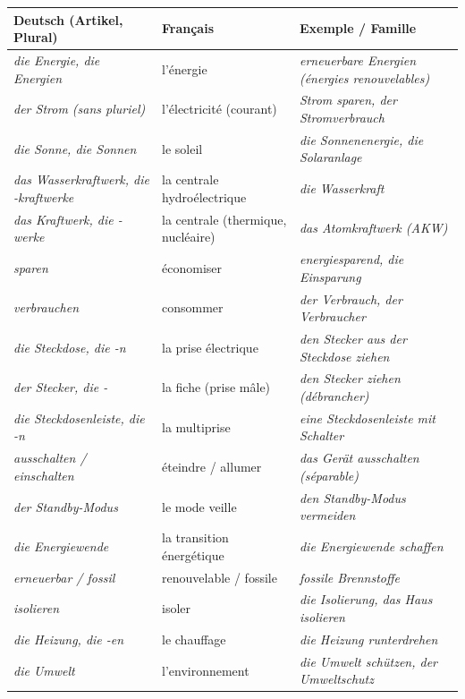 \documentclass[11pt]{article}
\newcommand{\all}[1]{\ifmmode\text{\textit{#1}}\else\begingroup\selectlanguage{ngerman}\itshape #1\endgroup\fi}
\begin{document}
\begin{center}
\begin{tabularx}{\linewidth}{|X|X|X|}\hline
\rowcolor{popblueL}
\textbf{Deutsch (Artikel, Plural)} & \textbf{Français} & \textbf{Exemple / Famille} \\ \hline
\all{die Energie, die Energien} & l'énergie & \all{erneuerbare Energien} (énergies renouvelables) \\ \hline
\all{der Strom} (sans pluriel) & l'électricité (courant) & \all{Strom sparen, der Stromverbrauch} \\ \hline
\all{die Sonne, die Sonnen} & le soleil & \all{die Sonnenenergie, die Solaranlage} \\ \hline
\all{das Wasserkraftwerk, die -kraftwerke} & la centrale hydroélectrique & \all{die Wasserkraft} \\ \hline
\all{das Kraftwerk, die -werke} & la centrale (thermique, nucléaire) & \all{das Atomkraftwerk (AKW)} \\ \hline
\all{sparen} & économiser & \all{energiesparend, die Einsparung} \\ \hline
\all{verbrauchen} & consommer & \all{der Verbrauch, der Verbraucher} \\ \hline
\all{die Steckdose, die -n} & la prise électrique & \all{den Stecker aus der Steckdose ziehen} \\ \hline
\all{der Stecker, die -} & la fiche (prise mâle) & \all{den Stecker ziehen} (débrancher) \\ \hline
\all{die Steckdosenleiste, die -n} & la multiprise & \all{eine Steckdosenleiste mit Schalter} \\ \hline
\all{ausschalten / einschalten} & éteindre / allumer & \all{das Gerät ausschalten} (séparable) \\ \hline
\all{der Standby-Modus} & le mode veille & \all{den Standby-Modus vermeiden} \\ \hline
\all{die Energiewende} & la transition énergétique & \all{die Energiewende schaffen} \\ \hline
\all{erneuerbar / fossil} & renouvelable / fossile & \all{fossile Brennstoffe} \\ \hline
\all{isolieren} & isoler & \all{die Isolierung, das Haus isolieren} \\ \hline
\all{die Heizung, die -en} & le chauffage & \all{die Heizung runterdrehen} \\ \hline
\all{die Umwelt} & l'environnement & \all{die Umwelt schützen, der Umweltschutz} \\ \hline
\end{tabularx}
\end{center}
\end{document}
